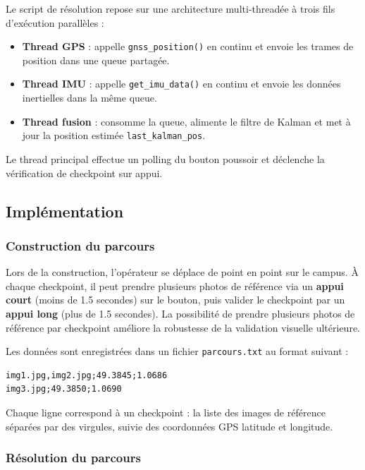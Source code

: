 Le script de résolution repose sur une architecture multi-threadée à trois
fils d'exécution parallèles :

\begin{itemize}
    \item \textbf{Thread GPS} : appelle \texttt{gnss\_position()} en continu
    et envoie les trames de position dans une queue partagée.
    \item \textbf{Thread IMU} : appelle \texttt{get\_imu\_data()} en continu
    et envoie les données inertielles dans la même queue.
    \item \textbf{Thread fusion} : consomme la queue, alimente le filtre de
    Kalman et met à jour la position estimée \texttt{last\_kalman\_pos}.
\end{itemize}

Le thread principal effectue un polling du bouton poussoir et déclenche la
vérification de checkpoint sur appui.

\subsection{Implémentation}

\subsubsection{Construction du parcours}

Lors de la construction, l'opérateur se déplace de point en point sur le
campus. À chaque checkpoint, il peut prendre plusieurs photos de référence
via un \textbf{appui court} (moins de 1.5 secondes) sur le bouton, puis
valider le checkpoint par un \textbf{appui long} (plus de 1.5 secondes).
La possibilité de prendre plusieurs photos de référence par checkpoint
améliore la robustesse de la validation visuelle ultérieure.

Les données sont enregistrées dans un fichier \texttt{parcours.txt} au
format suivant :

\begin{verbatim}
img1.jpg,img2.jpg;49.3845;1.0686
img3.jpg;49.3850;1.0690
\end{verbatim}

Chaque ligne correspond à un checkpoint : la liste des images de référence
séparées par des virgules, suivie des coordonnées GPS latitude et longitude.

\subsubsection{Résolution du parcours}

